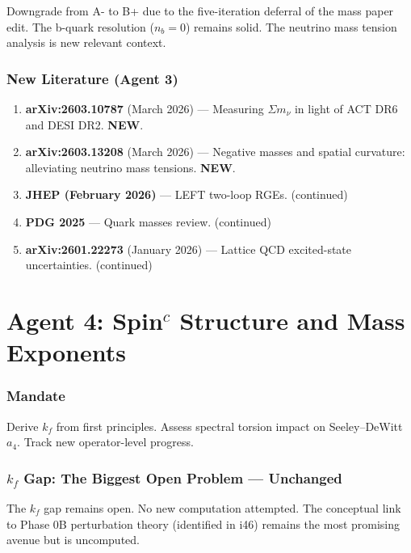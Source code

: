 \documentclass[11pt,a4paper]{article}
\newcommand{\NEW}{\textcolor{dfdblue}{\textbf{NEW}}}
\begin{document}
Downgrade from A- to B+ due to the five-iteration deferral of the mass paper edit. The b-quark resolution ($n_b = 0$) remains solid. The neutrino mass tension analysis is new relevant context.

\section{New Literature (Agent 3)}

\begin{enumerate}
\item \textbf{arXiv:2603.10787} (March 2026) --- Measuring $\Sigma m_\nu$ in light of ACT DR6 and DESI DR2. \NEW.
\item \textbf{arXiv:2603.13208} (March 2026) --- Negative masses and spatial curvature: alleviating neutrino mass tensions. \NEW.
\item \textbf{JHEP (February 2026)} --- LEFT two-loop RGEs. (continued)
\item \textbf{PDG 2025} --- Quark masses review. (continued)
\item \textbf{arXiv:2601.22273} (January 2026) --- Lattice QCD excited-state uncertainties. (continued)
\end{enumerate}


\part{Agent 4: Spin$^c$ Structure and Mass Exponents}
\label{part:agent4}

\section{Mandate}

Derive $k_f$ from first principles. Assess spectral torsion impact on Seeley--DeWitt $a_4$. Track new operator-level progress.

\section{$k_f$ Gap: The Biggest Open Problem --- Unchanged}

The $k_f$ gap remains open. No new computation attempted. The conceptual link to Phase 0B perturbation theory (identified in i46) remains the most promising avenue but is uncomputed.
\end{document}
